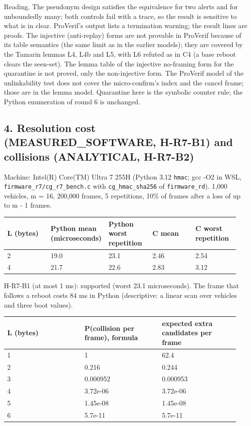 Reading. The pseudonym design satisfies the equivalence for two alerts and for unboundedly many; both controls fail with a trace, so the result is sensitive to what is in clear. ProVerif's output lists a termination warning; the result lines are proofs. The injective (anti-replay) forms are not provable in ProVerif because of its table semantics (the same limit as in the earlier models); they are covered by the Tamarin lemmas L4, L4b and L5, with L6 refuted as in C4 (a base reboot clears the seen-set). The lemma table of the injective no-framing form for the quarantine is not proved, only the non-injective form. The ProVerif model of the unlinkability test does not cover the micro-confirm's index and the cancel frame; those are in the lemma model. Quarantine here is the symbolic counter rule; the Python enumeration of round 6 is unchanged.

\subsection*{4. Resolution cost (MEASURED\_SOFTWARE, H-R7-B1) and collisions (ANALYTICAL, H-R7-B2)}

Machine: Intel(R) Core(TM) Ultra 7 255H (Python 3.12 \texttt{hmac}; gcc -O2 in WSL, \texttt{firmware\_r7/cg\_r7\_bench.c} with \texttt{cg\_hmac\_sha256} of \texttt{firmware\_rd}). 1,000 vehicles, m = 16, 200,000 frames, 5 repetitions, 10\% of frames after a loss of up to m - 1 frames.

{\scriptsize\raggedright
\begin{longtable}{p{0.190\linewidth}p{0.190\linewidth}p{0.190\linewidth}p{0.190\linewidth}p{0.190\linewidth}}
\toprule
L (bytes) & Python mean (microseconds) & Python worst repetition & C mean & C worst repetition \\
\midrule
\endhead
2 & 19.0 & 23.1 & 2.46 & 2.54 \\
4 & 21.7 & 22.6 & 2.83 & 3.12 \\
\bottomrule
\end{longtable}}

H-R7-B1 (at most 1 ms): supported (worst 23.1 microseconds). The frame that follows a reboot costs 84 ms in Python (descriptive: a linear scan over vehicles and three boot values).

{\scriptsize\raggedright
\begin{longtable}{p{0.317\linewidth}p{0.317\linewidth}p{0.317\linewidth}}
\toprule
L (bytes) & P(collision per frame), formula & expected extra candidates per frame \\
\midrule
\endhead
1 & 1 & 62.4 \\
2 & 0.216 & 0.244 \\
3 & 0.000952 & 0.000953 \\
4 & 3.72e-06 & 3.72e-06 \\
5 & 1.45e-08 & 1.45e-08 \\
6 & 5.7e-11 & 5.7e-11 \\
\bottomrule
\end{longtable}}

